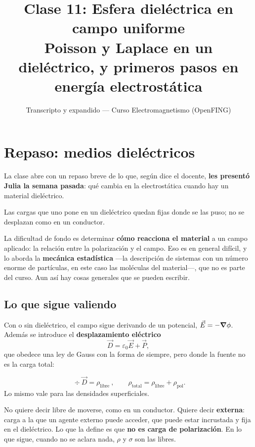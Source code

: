 \documentclass[12pt,a4paper]{article}
\title{\textbf{Clase 11: Esfera dieléctrica en campo uniforme} \\[0.3em]
        \large{Poisson y Laplace en un dieléctrico, y primeros pasos en energía electrostática}}
\author{Transcripto y expandido --- Curso Electromagnetismo (OpenFING)}
\date{}
\begin{document}
\maketitle
\thispagestyle{empty}
\newpage

\tableofcontents
\newpage

\section{Repaso: medios dieléctricos}

La clase abre con un repaso breve de lo que, según dice el docente, \textbf{les
presentó Julia la semana pasada}: qué cambia en la electrostática cuando hay un
material dieléctrico.

\begin{notebox}[Dieléctrico = aislante]
Las cargas que uno pone en un dieléctrico quedan fijas donde se las puso; no se
desplazan como en un conductor.
\end{notebox}

La dificultad de fondo es determinar \textbf{cómo reacciona el material} a un
campo aplicado: la relación entre la polarización y el campo. Eso es en general
difícil, y lo aborda la \textbf{mecánica estadística} ---la descripción de
sistemas con un número enorme de partículas, en este caso las moléculas del
material---, que no es parte del curso. Aun así hay cosas generales que se pueden
escribir.

\subsection{Lo que sigue valiendo}

Con o sin dieléctrico, el campo sigue derivando de un potencial,
$\vec E = -\grad\phi$. Además se introduce el \textbf{desplazamiento eléctrico}
\[
\vec D = \varepsilon_0 \vec E + \vec P,
\]
que obedece una ley de Gauss con la forma de siempre, pero donde la fuente no es
la carga total:

\begin{keybox}
\[
\boxed{\ \div\vec D = \rho_{\text{libre}}\ },
\qquad
\rho_{\text{total}} = \rho_{\text{libre}} + \rho_{\text{pol}} .
\]
Lo mismo vale para las densidades superficiales.
\end{keybox}

\begin{warnbox}
No quiere decir libre de moverse, como en un conductor. Quiere decir
\textbf{externa}: carga a la que un agente externo puede acceder, que puede estar
incrustada y fija en el dieléctrico. Lo que la define es que \textbf{no es carga
de polarización}. En lo que sigue, cuando no se aclara nada, $\rho$ y $\sigma$
son las libres.
\end{warnbox}
\end{document}
